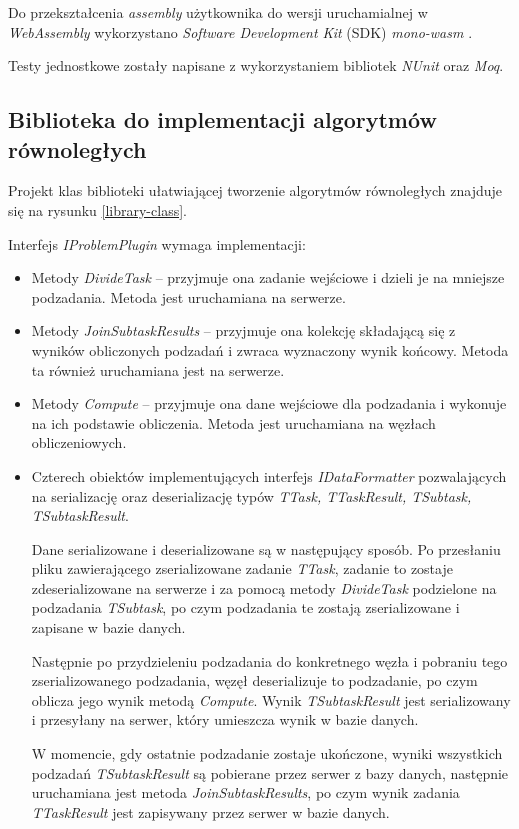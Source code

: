\documentclass[a4paper,11pt,twoside]{report}
\theoremstyle{definition}
\begin{document}
Do przekształcenia \textit{assembly} użytkownika do wersji uruchamialnej w \textit{WebAssembly} wykorzystano \textit{Software Development Kit} (SDK) \textit{mono-wasm} \cite{mono-wasm}.

Testy jednostkowe zostały napisane z wykorzystaniem bibliotek \textit{NUnit} oraz \textit{Moq}.

\subsection{Biblioteka do implementacji algorytmów równoległych}
\label{biblioteka-szczegoly}

Projekt klas biblioteki ułatwiającej tworzenie algorytmów równoległych znajduje się na rysunku \ref{library-class}.

Interfejs \textit{IProblemPlugin} wymaga implementacji:
\begin{itemize}
	\item Metody \textit{DivideTask} -- przyjmuje ona zadanie wejściowe i dzieli je na mniejsze podzadania. Metoda jest uruchamiana na serwerze.
	\item Metody \textit{JoinSubtaskResults} -- przyjmuje ona kolekcję składającą się z wyników obliczonych podzadań i zwraca wyznaczony wynik końcowy. Metoda ta również uruchamiana jest na serwerze.
	\item Metody \textit{Compute} -- przyjmuje ona dane wejściowe dla podzadania i wykonuje na ich podstawie obliczenia. Metoda jest uruchamiana na węzłach obliczeniowych.
	\item Czterech obiektów implementujących interfejs \textit{IDataFormatter} pozwalających na serializację oraz deserializację typów \textit{TTask, TTaskResult, TSubtask, TSubtaskResult}.
	
	Dane serializowane i deserializowane są w następujący sposób. Po przesłaniu pliku zawierającego zserializowane zadanie \textit{TTask}, zadanie to zostaje zdeserializowane na serwerze i za pomocą metody \textit{DivideTask} podzielone na podzadania \textit{TSubtask}, po czym podzadania te zostają zserializowane i zapisane w bazie danych.
	
	Następnie po przydzieleniu podzadania do konkretnego węzła i pobraniu tego zserializowanego podzadania, węzęł deserializuje to podzadanie, po czym oblicza jego wynik metodą \textit{Compute}. Wynik \textit{TSubtaskResult} jest serializowany i przesyłany na serwer, który umieszcza wynik w bazie danych.
	
	W momencie, gdy ostatnie podzadanie zostaje ukończone, wyniki wszystkich podzadań \textit{TSubtaskResult} są pobierane przez serwer z bazy danych, następnie uruchamiana jest metoda \textit{JoinSubtaskResults}, po czym wynik zadania \textit{TTaskResult} jest zapisywany przez serwer w bazie danych.
\end{itemize}
\end{document}
